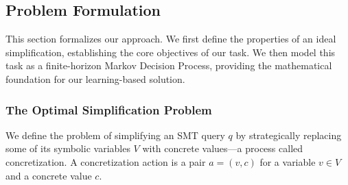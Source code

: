 \subsection{Problem Formulation}
\label{sec:problem-formalization}

This section formalizes our approach. We first define the properties of an ideal simplification, establishing the core objectives of our task. We then model this task as a finite-horizon Markov Decision Process, providing the mathematical foundation for our learning-based solution.

\subsubsection{The Optimal Simplification Problem}
We define the problem of simplifying an SMT query $q$ by strategically replacing some of its symbolic variables $V$ with concrete values—a process called concretization. A concretization action is a pair $a = (v, c)$ for a variable $v \in V$ and a concrete value $c$.

